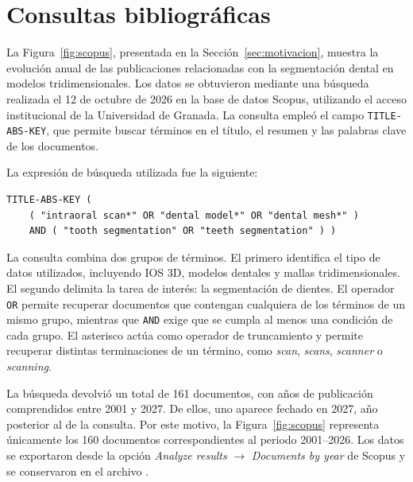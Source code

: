\chapter{Consultas bibliográficas}
\label{anx:consultas}

La Figura~\ref{fig:scopus}, presentada en la Sección~\ref{sec:motivacion}, muestra la evolución anual de las publicaciones relacionadas con la segmentación dental en modelos tridimensionales. Los datos se obtuvieron mediante una búsqueda realizada el 12 de octubre de 2026 en la base de datos Scopus, utilizando el acceso institucional de la Universidad de Granada. La consulta empleó el campo \texttt{TITLE-ABS-KEY}, que permite buscar términos en el título, el resumen y las palabras clave de los documentos.

La expresión de búsqueda utilizada fue la siguiente:

\begin{verbatim}
TITLE-ABS-KEY ( 
    ( "intraoral scan*" OR "dental model*" OR "dental mesh*" )
    AND ( "tooth segmentation" OR "teeth segmentation" ) )
\end{verbatim}

La consulta combina dos grupos de términos. El primero identifica el tipo de datos utilizados, incluyendo IOS 3D, modelos dentales y mallas tridimensionales. El segundo delimita la tarea de interés: la segmentación de dientes. El operador \texttt{OR} permite recuperar documentos que contengan cualquiera de los términos de un mismo grupo, mientras que \texttt{AND} exige que se cumpla al menos una condición de cada grupo. El asterisco actúa como operador de truncamiento y permite recuperar distintas terminaciones de un término, como \textit{scan}, \textit{scans}, \textit{scanner} o \textit{scanning}.

La búsqueda devolvió un total de 161 documentos, con años de publicación comprendidos entre 2001 y 2027. De ellos, uno aparece fechado en 2027, año posterior al de la consulta. Por este motivo, la Figura~\ref{fig:scopus} representa únicamente los 160 documentos correspondientes al periodo 2001--2026. Los datos se exportaron desde la opción \textit{Analyze results} $\rightarrow$ \textit{Documents by year} de Scopus y se conservaron en el archivo .
